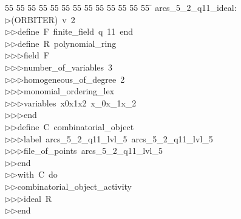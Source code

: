 %
%
\begin{tabbing}
55 \= 55 \= 55 \= 55 \= 55 \= 55 \= 55 \= 55 \= 55 \= 55 \= 55 \= 55 \= 55 \= \kill
arcs\_5\_2\_q11\_ideal:\\[0pt]
$\triangleright$\>(ORBITER)\ v\ 2\ \\[0pt]
$\triangleright$\>$\triangleright$\>define\ F\ finite\_field\ q\ 11\ end\ \\[0pt]
$\triangleright$\>$\triangleright$\>define\ R\ polynomial\_ring\ \\[0pt]
$\triangleright$\>$\triangleright$\>$\triangleright$\>field\ F\ \\[0pt]
$\triangleright$\>$\triangleright$\>$\triangleright$\>number\_of\_variables\ 3\ \\[0pt]
$\triangleright$\>$\triangleright$\>$\triangleright$\>homogeneous\_of\_degree\ 2\ \\[0pt]
$\triangleright$\>$\triangleright$\>$\triangleright$\>monomial\_ordering\_lex\ \\[0pt]
$\triangleright$\>$\triangleright$\>$\triangleright$\>variables\ x0x1x2\ x\_0x\_1x\_2\ \\[0pt]
$\triangleright$\>$\triangleright$\>$\triangleright$\>end\ \\[0pt]
$\triangleright$\>$\triangleright$\>define\ C\ combinatorial\_object\ \\[0pt]
$\triangleright$\>$\triangleright$\>$\triangleright$\>label\ arcs\_5\_2\_q11\_lvl\_5\ arcs\_5\_2\_q11\_lvl\_5\ \\[0pt]
$\triangleright$\>$\triangleright$\>$\triangleright$\>file\_of\_points\ arcs\_5\_2\_q11\_lvl\_5\ \\[0pt]
$\triangleright$\>$\triangleright$\>end\ \\[0pt]
$\triangleright$\>$\triangleright$\>with\ C\ do\ \\[0pt]
$\triangleright$\>$\triangleright$\>combinatorial\_object\_activity\ \\[0pt]
$\triangleright$\>$\triangleright$\>$\triangleright$\>ideal\ R\ \\[0pt]
$\triangleright$\>$\triangleright$\>end\\[0pt]
\end{tabbing}
